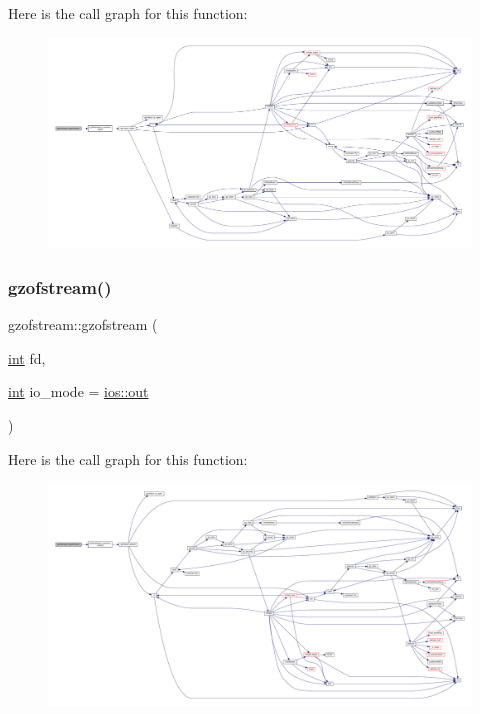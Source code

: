 Here is the call graph for this function\+:
\nopagebreak
\begin{figure}[H]
\begin{center}
\leavevmode
\includegraphics[width=350pt]{classgzofstream_aad6a405bc9ecfd82cc0861a15e4a6983_cgraph}
\end{center}
\end{figure}
\mbox{\label{classgzofstream_a5291a0c4c0e7f6f18ca72ae98f4e4d40}} 
\subsubsection{\texorpdfstring{gzofstream()}{gzofstream()}\hspace{0.1cm}{\footnotesize\ttfamily [3/6]}}
{\footnotesize\ttfamily gzofstream\+::gzofstream (\begin{DoxyParamCaption}\item[{\mbox{\hyperlink{ioapi_8h_a787fa3cf048117ba7123753c1e74fcd6}{int}}}]{fd,  }\item[{\mbox{\hyperlink{ioapi_8h_a787fa3cf048117ba7123753c1e74fcd6}{int}}}]{io\+\_\+mode = {\ttfamily \mbox{\hyperlink{gun_8c_acb2d4658684492100bc328998f52ae82}{ios\+::out}}} }\end{DoxyParamCaption})}

Here is the call graph for this function\+:
\nopagebreak
\begin{figure}[H]
\begin{center}
\leavevmode
\includegraphics[width=350pt]{classgzofstream_a5291a0c4c0e7f6f18ca72ae98f4e4d40_cgraph}
\end{center}
\end{figure}
\mbox{\label{classgzofstream_a0bb8fbe1347ddee2e349f0038bc4bee0}} 
